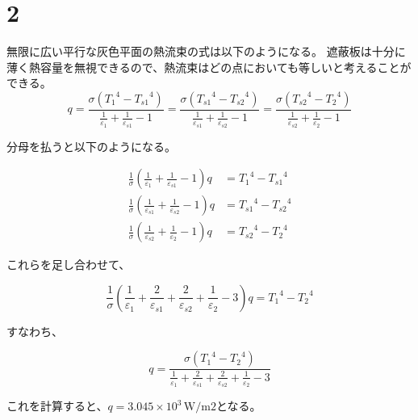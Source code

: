 \documentclass{jsarticle}
\begin{document}
\section*{2}
無限に広い平行な灰色平面の熱流束の式は以下のようになる。
遮蔽板は十分に薄く熱容量を無視できるので、熱流束はどの点においても等しいと考えることができる。
\begin{equation}
	q=\frac{
		\sigma({T_1}^4 - {T_{s1}}^4)
	}{
		\frac{1}{\varepsilon_1} +
		\frac{1}{\varepsilon_{s1}} - 1
	}=\frac{
		\sigma({T_{s1}}^4 - {T_{s2}}^4)
	}{
		\frac{1}{\varepsilon_{s1}} +
		\frac{1}{\varepsilon_{s2}} - 1
	}=\frac{
		\sigma({T_{s2}}^4 - {T_{2}}^4)
	}{
		\frac{1}{\varepsilon_{s2}} +
		\frac{1}{\varepsilon_{2}} - 1
	}
\end{equation}

分母を払うと以下のようになる。

\begin{align}
	\frac{1}{\sigma}
	\left(
	\frac{1}{\varepsilon_1} +
	\frac{1}{\varepsilon_{s1}} - 1
	\right) q & =
	{T_1}^4 - {T_{s1}}^4    \\
	\frac{1}{\sigma}
	\left(
	\frac{1}{\varepsilon_{s1}} +
	\frac{1}{\varepsilon_{s2}} - 1
	\right) q & =
	{T_{s1}}^4 - {T_{s2}}^4 \\
	\frac{1}{\sigma}
	\left(
	\frac{1}{\varepsilon_{s2}} +
	\frac{1}{\varepsilon_{2}} - 1
	\right) q & =
	{T_{s2}}^4 - {T_{2}}^4
\end{align}

これらを足し合わせて、

\begin{equation}
	\frac{1}{\sigma}
	\left(
	\frac{1}{\varepsilon_1} +
	\frac{2}{\varepsilon_{s1}} +
	\frac{2}{\varepsilon_{s2}} +
	\frac{1}{\varepsilon_{2}} - 3
	\right) q =
	{T_1}^4 - {T_2}^4
\end{equation}

すなわち、

\begin{equation}
	q = \frac{
		\sigma({T_1}^4 - {T_2}^4)
	}{
		\frac{1}{\varepsilon_1} +
		\frac{2}{\varepsilon_{s1}} +
		\frac{2}{\varepsilon_{s2}} +
		\frac{1}{\varepsilon_{2}} - 3
	}
\end{equation}

これを計算すると、$q = 3.045\times10^3 \mathrm{\,W/m2}$となる。
\end{document}
